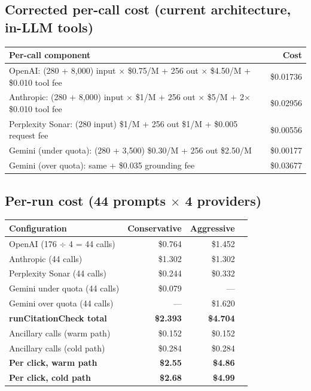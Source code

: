 \documentclass[11pt,letterpaper]{article}
\begin{document}
\subsection{Corrected per-call cost (current architecture, in-LLM tools)}

\begin{center}
\begin{tabular}{@{}lr@{}}
\toprule
\textbf{Per-call component} & \textbf{Cost} \\
\midrule
OpenAI: (280 + 8,000) input $\times$ \$0.75/M + 256 out $\times$ \$4.50/M + \$0.010 tool fee & \$0.01736 \\
Anthropic: (280 + 8,000) input $\times$ \$1/M + 256 out $\times$ \$5/M + 2$\times$\$0.010 tool fee & \$0.02956 \\
Perplexity Sonar: (280 input) \$1/M + 256 out \$1/M + \$0.005 request fee & \$0.00556 \\
Gemini (under quota): (280 + 3,500) \$0.30/M + 256 out \$2.50/M & \$0.00177 \\
Gemini (over quota): same + \$0.035 grounding fee & \$0.03677 \\
\bottomrule
\end{tabular}
\end{center}

\subsection{Per-run cost (44 prompts $\times$ 4 providers)}

\begin{center}
\begin{tabular}{@{}lrrr@{}}
\toprule
\textbf{Configuration} & \textbf{Conservative} & \textbf{Aggressive} \\
\midrule
OpenAI (176 $\div$ 4 = 44 calls)    & \$0.764 & \$1.452 \\
Anthropic (44 calls)                 & \$1.302 & \$1.302 \\
Perplexity Sonar (44 calls)          & \$0.244 & \$0.332 \\
Gemini under quota (44 calls)        & \$0.079 & --- \\
Gemini over quota (44 calls)         & ---      & \$1.620 \\
\midrule
\textbf{runCitationCheck total}      & \textbf{\$2.393} & \textbf{\$4.704} \\
\midrule
Ancillary calls (warm path)          & \$0.152 & \$0.152 \\
Ancillary calls (cold path)          & \$0.284 & \$0.284 \\
\midrule
\textbf{Per click, warm path}        & \textbf{\$2.55} & \textbf{\$4.86} \\
\textbf{Per click, cold path}        & \textbf{\$2.68} & \textbf{\$4.99} \\
\bottomrule
\end{tabular}
\end{center}
\end{document}
